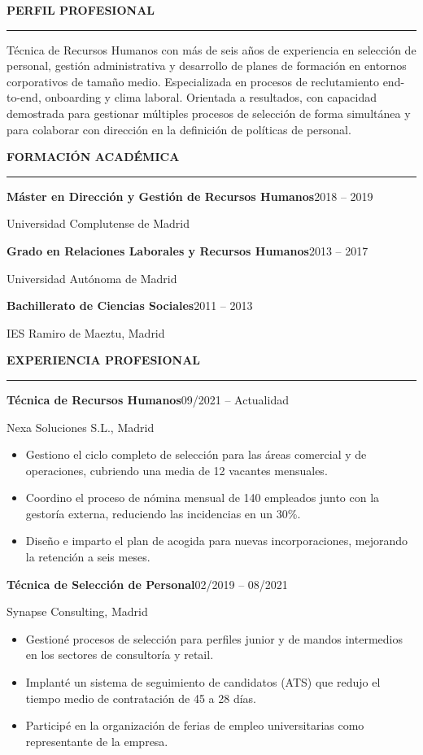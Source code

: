 \documentclass[10pt,a4paper]{article}
\newcommand{\mainsection}[1]{%
  \vspace{2pt}
  {\color{primary}\Large\bfseries\MakeUppercase{#1}}\par
  \vspace{-6pt}
  {\color{primary}\rule{\linewidth}{1pt}}\par
  \vspace{5pt}
}
\newcommand{\jobtitle}[2]{%
  \textbf{\color{ink}#1}\hfill{\small\color{muted}#2}\par
}
\begin{document}
\begin{minipage}[t]{0.615\textwidth}

\mainsection{Perfil profesional}

T\'ecnica de Recursos Humanos con m\'as de seis a\~nos de experiencia en selecci\'on de
personal, gesti\'on administrativa y desarrollo de planes de formaci\'on en entornos
corporativos de tama\~no medio. Especializada en procesos de reclutamiento end-to-end,
onboarding y clima laboral. Orientada a resultados, con capacidad demostrada para
gestionar m\'ultiples procesos de selecci\'on de forma simult\'anea y para colaborar con
direcci\'on en la definici\'on de pol\'iticas de personal.

\mainsection{Formaci\'on acad\'emica}

\jobtitle{M\'aster en Direcci\'on y Gesti\'on de Recursos Humanos}{2018 -- 2019}
{\small\color{primary} Universidad Complutense de Madrid}\par
\vspace{6pt}

\jobtitle{Grado en Relaciones Laborales y Recursos Humanos}{2013 -- 2017}
{\small\color{primary} Universidad Aut\'onoma de Madrid}\par
\vspace{6pt}

\jobtitle{Bachillerato de Ciencias Sociales}{2011 -- 2013}
{\small\color{primary} IES Ramiro de Maeztu, Madrid}\par

\mainsection{Experiencia profesional}

\jobtitle{T\'ecnica de Recursos Humanos}{09/2021 -- Actualidad}
{\small\color{primary} Nexa Soluciones S.L., Madrid}
\begin{itemize}[leftmargin=14pt,itemsep=1pt,topsep=3pt,parsep=0pt]
\item Gestiono el ciclo completo de selecci\'on para las \'areas comercial y de
operaciones, cubriendo una media de 12 vacantes mensuales.
\item Coordino el proceso de n\'omina mensual de 140 empleados junto con la gestor\'ia
externa, reduciendo las incidencias en un 30\%.
\item Dise\~no e imparto el plan de acogida para nuevas incorporaciones, mejorando la
retenci\'on a seis meses.
\end{itemize}
\vspace{6pt}

\jobtitle{T\'ecnica de Selecci\'on de Personal}{02/2019 -- 08/2021}
{\small\color{primary} Synapse Consulting, Madrid}
\begin{itemize}[leftmargin=14pt,itemsep=1pt,topsep=3pt,parsep=0pt]
\item Gestion\'e procesos de selecci\'on para perfiles junior y de mandos intermedios
en los sectores de consultor\'ia y retail.
\item Implant\'e un sistema de seguimiento de candidatos (ATS) que redujo el tiempo
medio de contrataci\'on de 45 a 28 d\'ias.
\item Particip\'e en la organizaci\'on de ferias de empleo universitarias como
representante de la empresa.
\end{itemize}
\vspace{6pt}


\end{minipage}
\end{document}
